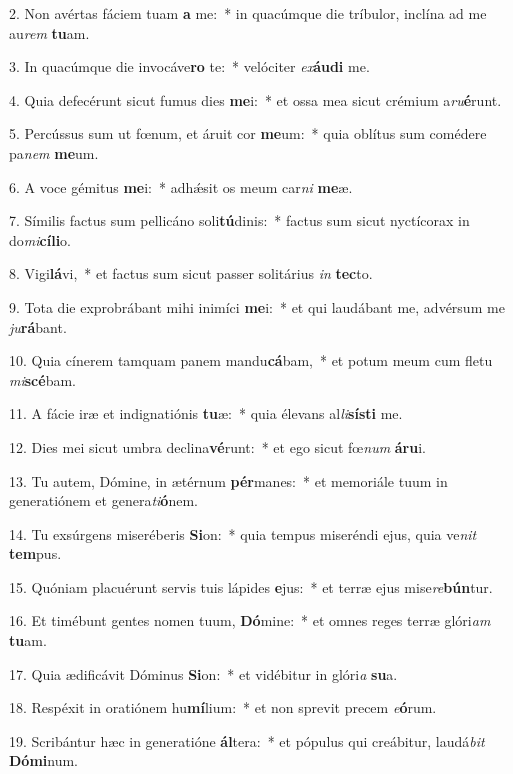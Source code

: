 2. Non avértas fáciem tuam \textbf{a} me:~*  in quacúmque die tríbulor, inclína ad me au\textit{rem} \textbf{tu}am.\

3. In quacúmque die invocáve\textbf{ro} te:~*  velóciter \textit{ex}\textbf{áu}\textbf{di} me.\

4. Quia defecérunt sicut fumus dies \textbf{me}i:~*  et ossa mea sicut crémium a\textit{ru}\textbf{é}runt.\

5. Percússus sum ut fœnum, et áruit cor \textbf{me}um:~*  quia oblítus sum comédere pa\textit{nem} \textbf{me}um.\

6. A voce gémitus \textbf{me}i:~*  adhǽsit os meum car\textit{ni} \textbf{me}æ.\

7. Símilis factus sum pellicáno soli\textbf{tú}dinis:~*  factus sum sicut nyctícorax in do\textit{mi}\textbf{cí}\textbf{li}o.\

8. Vigi\textbf{lá}vi,~*  et factus sum sicut passer solitárius \textit{in} \textbf{tec}to.\

9. Tota die exprobrábant mihi inimíci \textbf{me}i:~*  et qui laudábant me, advérsum me \textit{ju}\textbf{rá}bant.\

10. Quia cínerem tamquam panem mandu\textbf{cá}bam,~*  et potum meum cum fletu \textit{mi}\textbf{scé}bam.\

11. A fácie iræ et indignatiónis \textbf{tu}æ:~*  quia élevans al\textit{li}\textbf{sís}\textbf{ti} me.\

12. Dies mei sicut umbra declina\textbf{vé}runt:~*  et ego sicut fœ\textit{num} \textbf{á}\textbf{ru}i.\

13. Tu autem, Dómine, in ætérnum \textbf{pér}manes:~*  et memoriále tuum in generatiónem et genera\textit{ti}\textbf{ó}nem.\

14. Tu exsúrgens miseréberis \textbf{Si}on:~*  quia tempus miseréndi ejus, quia ve\textit{nit} \textbf{tem}pus.\

15. Quóniam placuérunt servis tuis lápides \textbf{e}jus:~*  et terræ ejus mise\textit{re}\textbf{bún}tur.\

16. Et timébunt gentes nomen tuum, \textbf{Dó}mine:~*  et omnes reges terræ glóri\textit{am} \textbf{tu}am.\

17. Quia ædificávit Dóminus \textbf{Si}on:~*  et vidébitur in glóri\textit{a} \textbf{su}a.\

18. Respéxit in oratiónem hu\textbf{mí}lium:~*  et non sprevit precem \textit{e}\textbf{ó}rum.\

19. Scribántur hæc in generatióne \textbf{ál}tera:~*  et pópulus qui creábitur, laudá\textit{bit} \textbf{Dó}\textbf{mi}num.\

